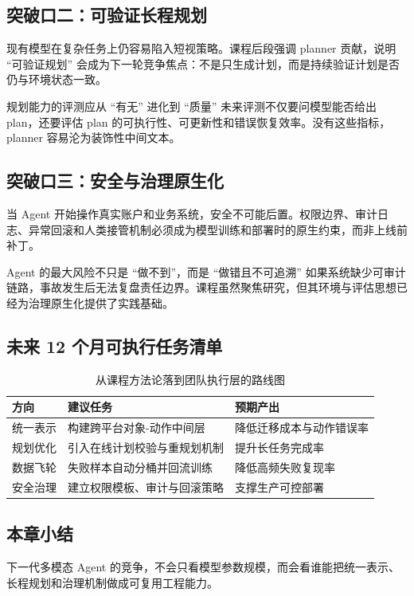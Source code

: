\documentclass[a4paper]{article}
\begin{document}
\subsection{突破口二：可验证长程规划}
现有模型在复杂任务上仍容易陷入短视策略。课程后段强调 planner 贡献，说明 ``可验证规划'' 会成为下一轮竞争焦点：不是只生成计划，而是持续验证计划是否仍与环境状态一致。

\begin{importantbox}{规划能力的评测应从 ``有无'' 进化到 ``质量''}
未来评测不仅要问模型能否给出 plan，还要评估 plan 的可执行性、可更新性和错误恢复效率。没有这些指标，planner 容易沦为装饰性中间文本。
\end{importantbox}

\subsection{突破口三：安全与治理原生化}
当 Agent 开始操作真实账户和业务系统，安全不可能后置。权限边界、审计日志、异常回滚和人类接管机制必须成为模型训练和部署时的原生约束，而非上线前补丁。

\begin{warningbox}{Agent 的最大风险不只是 ``做不到''，而是 ``做错且不可追溯''}
如果系统缺少可审计链路，事故发生后无法复盘责任边界。课程虽然聚焦研究，但其环境与评估思想已经为治理原生化提供了实践基础。
\end{warningbox}

\subsection{未来 12 个月可执行任务清单}
\begin{table}[H]
\centering
\begin{tabular}{p{2.8cm}p{4.8cm}p{3.6cm}}
\toprule
\textbf{方向} & \textbf{建议任务} & \textbf{预期产出} \\
\midrule
统一表示 & 构建跨平台对象-动作中间层 & 降低迁移成本与动作错误率 \\
规划优化 & 引入在线计划校验与重规划机制 & 提升长任务完成率 \\
数据飞轮 & 失败样本自动分桶并回流训练 & 降低高频失败复现率 \\
安全治理 & 建立权限模板、审计与回滚策略 & 支撑生产可控部署 \\
\bottomrule
\end{tabular}
\caption{从课程方法论落到团队执行层的路线图}
\end{table}

\subsection{本章小结}
下一代多模态 Agent 的竞争，不会只看模型参数规模，而会看谁能把统一表示、长程规划和治理机制做成可复用工程能力。
\end{document}
